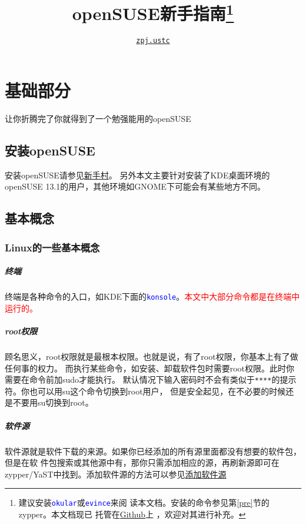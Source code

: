 \documentclass[10pt,openany]{book}
\newcommand{\command}[1]{\texttt{\textcolor{blue}{#1}}}
\newcommand{\soft}[1]{\texttt{\textcolor{blue}{#1}}}
\begin{document}
\title{openSUSE新手指南\thanks{建议安装\command{okular}或\command{evince}来阅
读本文档。安装的命令参见第\ref{pre}节的zypper。本文档现已
托管在\href{https://github.com/zpj-ustc/openSUSE-novice-guide}{Github}上
，欢迎对其进行补充。}}
\author{\href{mailto:zpj.ustc@gmail.com}{\texttt{zpj.ustc}}}
\maketitle
\tableofcontents
\newpage
\chapter{基础部分}
让你折腾完了你就得到了一个勉强能用的openSUSE
\section{安装openSUSE}
安装openSUSE请参见\href{https://zh.opensuse.org/%E6%96%B0%E6%89%8B%E6%9D%91}{新手村}。
另外本文主要针对安装了KDE桌面环境的openSUSE 13.1的用户，其他环境如GNOME下可能会有某些地方不同。

\section{基本概念}
\subsection{Linux的一些基本概念}
\paragraph{终端} 终端是各种命令的入口，如KDE下面的\soft{konsole}。\textcolor{red}{本文中大部分命令都是在终端中运行的。}

\paragraph{root权限} 顾名思义，root权限就是最根本权限。也就是说，有了root权限，你基本上有了做任何事的权力。
而执行某些命令，如安装、卸载软件包时需要root权限。此时你需要在命令前加sudo才能执行。
默认情况下输入密码时不会有类似于\texttt{****}的提示符。你也可以用su这个命令切换到root用户，
但是安全起见，在不必要的时候还是不要用su切换到root。

\paragraph{软件源} 软件源就是软件下载的来源。如果你已经添加的所有源里面都没有想要的软件包，但是在软
件包搜索或其他源中有，那你只需添加相应的源，再刷新源即可在zypper/YaST中找到。添加软件源的方法可以参见\href{https://zh.opensuse.org/SDB:%E6%B7%BB%E5%8A%A0%E8%BD%AF%E4%BB%B6%E6%BA%90}{添加软件源}
\end{document}
